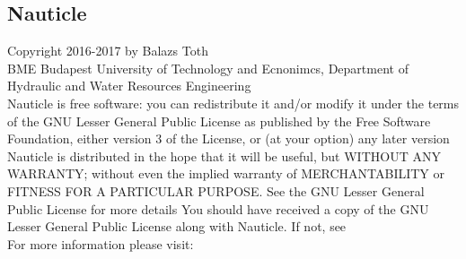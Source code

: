 \documentclass[a4paper,12pt,openany]{book}
\newcommand{\myhref}[3][nauticlegreen_dark]{\href{#2}{\color{#1}{#3}}}%
\theoremstyle{break}
\begin{document}
\subsection{Nauticle}
\noindent
Copyright \textcopyright{} 2016-2017 by Balazs Toth \\
\noindent
BME Budapest University of Technology and Ecnonimcs, Department of Hydraulic and Water Resources Engineering\\

Nauticle is free software: you can redistribute it and/or modify it under the terms of the GNU Lesser General Public License as published by the Free Software Foundation, either version 3 of the License, or (at your option) any later version Nauticle is distributed in the hope that it will be useful, but WITHOUT ANY WARRANTY; without even the implied warranty of MERCHANTABILITY or FITNESS FOR A PARTICULAR PURPOSE.  See the GNU Lesser General Public License for more details You should have received a copy of the GNU Lesser General Public License along with Nauticle.  If not, see \myhref{http://www.gnu.org/licenses/}{http://www.gnu.org/licenses/}\\
 For more information please visit: \myhref{https://bitbucket.org/Nauticleproject/}{https://bitbucket.org/Nauticleproject/}
\end{document}

